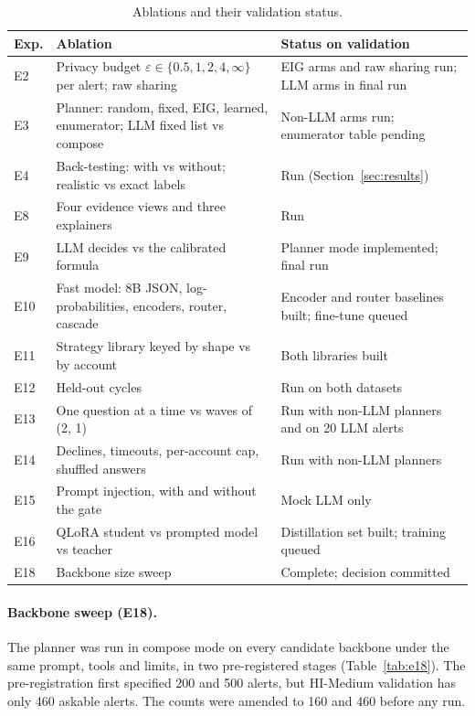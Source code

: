 \documentclass[11pt,a4paper]{article}
\newcommand{\eps}{\varepsilon}
\begin{document}
\begin{table}[!htbp]
\centering\small
\begin{tabularx}{\textwidth}{@{}lLL@{}}
\toprule
Exp. & Ablation & Status on validation \\
\midrule
E2 & Privacy budget $\eps \in \{0.5,1,2,4,\infty\}$ per alert; raw sharing & EIG arms and raw sharing run; LLM arms in final run \\
E3 & Planner: random, fixed, EIG, learned, enumerator; LLM fixed list vs compose & Non-LLM arms run; enumerator table pending \\
E4 & Back-testing: with vs without; realistic vs exact labels & Run (Section~\ref{sec:results}) \\
E8 & Four evidence views and three explainers & Run \\
E9 & LLM decides vs the calibrated formula & Planner mode implemented; final run \\
E10 & Fast model: 8B JSON, log-probabilities, encoders, router, cascade & Encoder and router baselines built; fine-tune queued \\
E11 & Strategy library keyed by shape vs by account & Both libraries built \\
E12 & Held-out cycles & Run on both datasets \\
E13 & One question at a time vs waves of (2, 1) & Run with non-LLM planners and on 20 LLM alerts \\
E14 & Declines, timeouts, per-account cap, shuffled answers & Run with non-LLM planners \\
E15 & Prompt injection, with and without the gate & Mock LLM only \\
E16 & QLoRA student vs prompted model vs teacher & Distillation set built; training queued \\
E18 & Backbone size sweep & Complete; decision committed \\
\bottomrule
\end{tabularx}
\caption{Ablations and their validation status.}
\label{tab:ablations}
\end{table}

\paragraph{Backbone sweep (E18).} The planner was run in compose mode on every candidate backbone under the same prompt, tools and limits, in two pre-registered stages (Table~\ref{tab:e18}). The pre-registration first specified 200 and 500 alerts, but HI-Medium validation has only 460 askable alerts. The counts were amended to 160 and 460 before any run.
\end{document}
